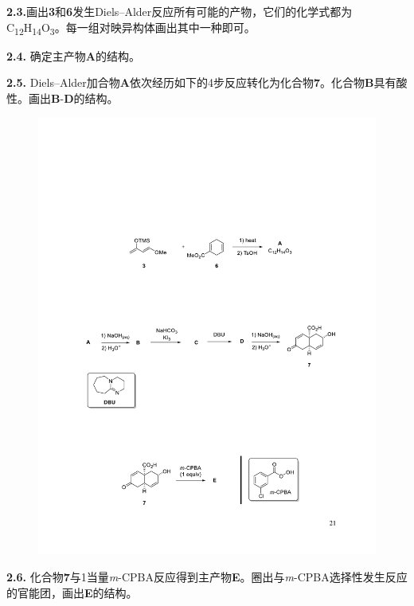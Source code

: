 \noindent\textbf{2.3.}画出\textbf{3}和\textbf{6}发生Diels--Alder反应所有可能的产物，它们的化学式都为C\textsubscript{12}H\textsubscript{14}O\textsubscript{3}。每一组对映异构体画出其中一种即可。

\noindent\textbf{2.4.} 确定主产物\textbf{A}的结构。

\noindent\textbf{2.5.} Diels--Alder加合物\textbf{A}依次经历如下的4步反应转化为化合物\textbf{7}。化合物\textbf{B}具有酸性。画出\textbf{B}-\textbf{D}的结构。

\begin{figure}[h]
	\centering
	\includegraphics[width=14cm]{./pic/t2-7.pdf}
\end{figure}

\noindent\textbf{2.6.} 化合物\textbf{7}与1当量\emph{m}-CPBA反应得到主产物\textbf{E}。圈出与\emph{m}-CPBA选择性发生反应的官能团，画出\textbf{E}的结构。

